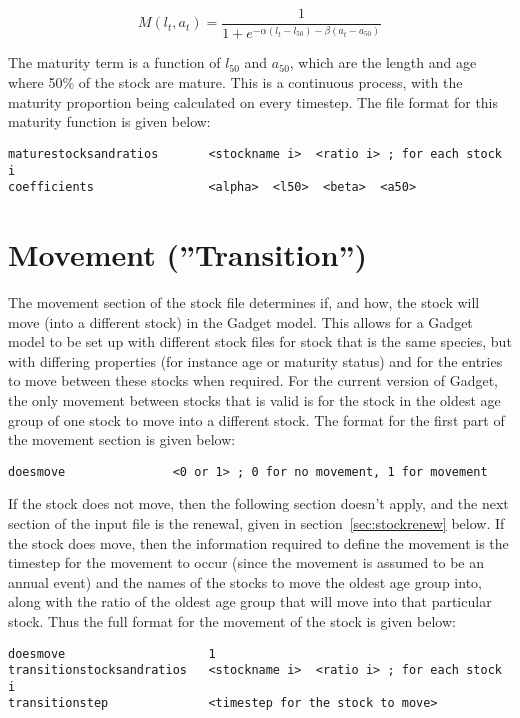\documentclass[10pt,twoside]{book}
\begin{document}
\begin{equation}\label{eq:mat1b}
M(l_{t},a_{t}) = \frac{1}{1 + e^{-\alpha(l_{t} - l_{50}) - \beta(a_{t} - a_{50})}}
\end{equation}

\bigskip
The maturity term is a function of $l_{50}$ and $a_{50}$, which are the length and age where 50\% of the stock are mature.  This is a continuous process, with the maturity proportion being calculated on every timestep.  The file format for this maturity function is given below:

{\small\begin{verbatim}
maturestocksandratios       <stockname i>  <ratio i> ; for each stock i
coefficients                <alpha>  <l50>  <beta>  <a50>
\end{verbatim}}

\section{Movement (''Transition'')}\label{sec:stockmove}
The movement section of the stock file determines if, and how, the stock will move (into a different stock) in the Gadget model.  This allows for a Gadget model to be set up with different stock files for stock that is the same species, but with differing properties (for instance age or maturity status) and for the entries to move between these stocks when required.  For the current version of Gadget, the only movement between stocks that is valid is for the stock in the oldest age group of one stock to move into a different stock.  The format for the first part of the movement section is given below:

{\small\begin{verbatim}
doesmove               <0 or 1> ; 0 for no movement, 1 for movement
\end{verbatim}}

If the stock does not move, then the following section doesn't apply, and the next section of the input file is the renewal, given in section~\ref{sec:stockrenew} below.  If the stock does move, then the information required to define the movement is the timestep for the movement to occur (since the movement is assumed to be an annual event) and the names of the stocks to move the oldest age group into, along with the ratio of the oldest age group that will move into that particular stock.  Thus the full format for the movement of the stock is given below:

{\small\begin{verbatim}
doesmove                    1
transitionstocksandratios   <stockname i>  <ratio i> ; for each stock i
transitionstep              <timestep for the stock to move>
\end{verbatim}}
\end{document}
